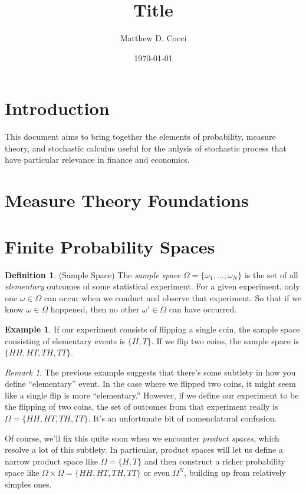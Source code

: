 \documentclass[12pt]{article}
\author{Matthew D. Cocci}
\title{Title}
\date{\today}
\theoremstyle{plain}
\theoremstyle{definition}
\newtheorem{defn}[thm]{Definition}
\newtheorem{ex}[thm]{Example}
\theoremstyle{remark}
\newtheorem*{rmk}{Remark}
\begin{document}
\maketitle
\tableofcontents

\clearpage

\section{Introduction}

This document aims to bring together the elements of probability,
measure theory, and stochastic calculus useful for the anlysis of
stochastic process that have particular relevance in finance and
economics.

\section{Measure Theory Foundations}


\section{Finite Probability Spaces}

\begin{defn}{(Sample Space)}
The \emph{sample space} $\Omega=\{\omega_1,\ldots,\omega_N\}$ is the set
of all \emph{elementary} outcomes of some statistical experiment. For a
given experiment, only one $\omega \in \Omega$ can occur when we conduct
and observe that experiment.  So that if we know $\omega \in \Omega$
happened, then no other $\omega' \in \Omega$ can have occurred.
\end{defn}
\begin{ex}
If our experiment consists of flipping a single coin, the sample space
consisting of elementary events is $\{H,T\}$. If we flip two coins, the
sample space is $\{HH,HT,TH,TT\}$.
\end{ex}
\begin{rmk}
The previous example suggests that there's some subtlety in how you
define ``elementary'' event. In the case where we flipped two coins, it
might seem like a single flip is more ``elementary.'' However, if we define
our experiment to be the flipping of two coins, the set of outcomes from
that experiment really is $\Omega=\{HH,HT,TH,TT\}$. It's an unfortunate
bit of nomenclatural confusion.

Of course, we'll fix this quite soon when we encounter \emph{product
spaces}, which resolve a lot of this subtlety. In particular, product
spaces will let us define a narrow product space like $\Omega=\{H,T\}$
and then construct a richer probability space like $\Omega\times \Omega
= \{HH,HT,TH,TT\}$ or even $\Omega^N$, building up from relatively
simples ones.
\end{rmk}
\end{document}
